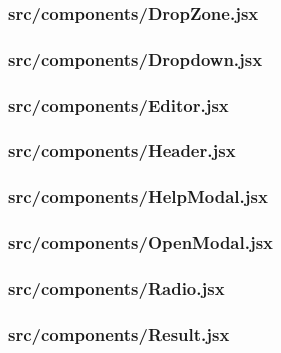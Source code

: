 \subsubsection{src/components/DropZone.jsx}
\label{app:client_src_components_DropZone_jsx}

\subsubsection{src/components/Dropdown.jsx}
\label{app:client_src_components_Dropdown_jsx}

\subsubsection{src/components/Editor.jsx}
\label{app:client_src_components_Editor_jsx}

\subsubsection{src/components/Header.jsx}
\label{app:client_src_components_Header_jsx}

\subsubsection{src/components/HelpModal.jsx}
\label{app:client_src_components_HelpModal_jsx}

\subsubsection{src/components/OpenModal.jsx}
\label{app:client_src_components_OpenModal_jsx}

\subsubsection{src/components/Radio.jsx}
\label{app:client_src_components_Radio_jsx}

\subsubsection{src/components/Result.jsx}
\label{app:client_src_components_Result_jsx}

